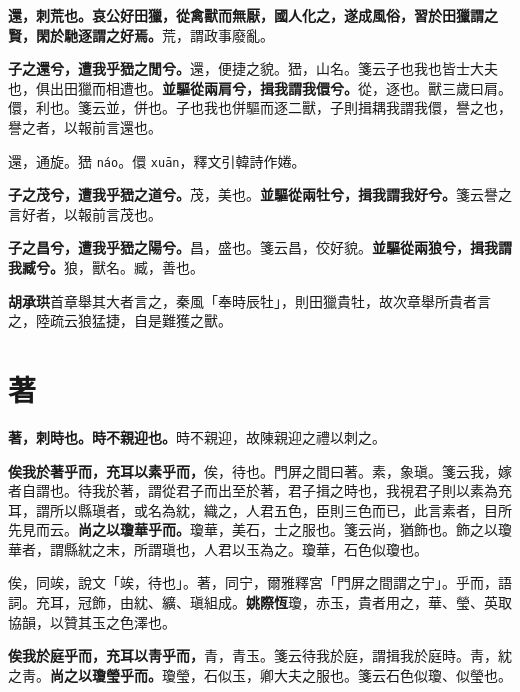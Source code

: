 
\textbf{還，刺荒也。哀公好田獵，從禽獸而無厭，國人化之，遂成風俗，習於田獵謂之賢，閑於馳逐謂之好焉。}{\footnotesize 荒，謂政事廢亂。}

\textbf{子之還兮，遭我乎峱之閒兮。}{\footnotesize 還，便捷之貌。峱，山名。箋云子也我也皆士大夫也，俱出田獵而相遭也。}\textbf{並驅從兩肩兮，揖我謂我儇兮。}{\footnotesize 從，逐也。獸三歲曰肩。儇，利也。箋云並，併也。子也我也併驅而逐二獸，子則揖耦我謂我儇，譽之也，譽之者，以報前言還也。}

\begin{quoting}還，通旋。峱 \texttt{náo}。儇 \texttt{xuān}，釋文引韓詩作婘。\end{quoting}

\textbf{子之茂兮，遭我乎峱之道兮。}{\footnotesize 茂，美也。}\textbf{並驅從兩牡兮，揖我謂我好兮。}{\footnotesize 箋云譽之言好者，以報前言茂也。}

\textbf{子之昌兮，遭我乎峱之陽兮。}{\footnotesize 昌，盛也。箋云昌，佼好貌。}\textbf{並驅從兩狼兮，揖我謂我臧兮。}{\footnotesize 狼，獸名。臧，善也。}

\begin{quoting}\textbf{胡承珙}首章舉其大者言之，秦風「奉時辰牡」，則田獵貴牡，故次章舉所貴者言之，陸疏云狼猛捷，自是難獲之獸。\end{quoting}

\section{著}


\textbf{著，刺時也。時不親迎也。}{\footnotesize 時不親迎，故陳親迎之禮以刺之。}

\textbf{俟我於著乎而，充耳以素乎而，}{\footnotesize 俟，待也。門屏之間曰著。素，象瑱。箋云我，嫁者自謂也。待我於著，謂從君子而出至於著，君子揖之時也，我視君子則以素為充耳，謂所以縣瑱者，或名為紞，織之，人君五色，臣則三色而已，此言素者，目所先見而云。}\textbf{尚之以瓊華乎而。}{\footnotesize 瓊華，美石，士之服也。箋云尚，猶飾也。飾之以瓊華者，謂縣紞之末，所謂瑱也，人君以玉為之。瓊華，石色似瓊也。}

\begin{quoting}俟，同竢，說文「竢，待也」。著，同宁，爾雅釋宮「門屏之間謂之宁」。乎而，語詞。充耳，冠飾，由紞、纊、瑱組成。\textbf{姚際恆}瓊，赤玉，貴者用之，華、瑩、英取協韻，以贊其玉之色澤也。\end{quoting}

\textbf{俟我於庭乎而，充耳以靑乎而，}{\footnotesize 青，青玉。箋云待我於庭，謂揖我於庭時。靑，紞之靑。}\textbf{尚之以瓊瑩乎而。}{\footnotesize 瓊瑩，石似玉，卿大夫之服也。箋云石色似瓊、似瑩也。}

